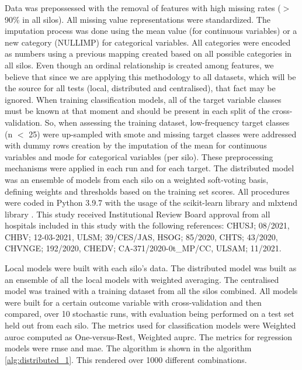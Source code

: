 Data was prepossessed with the removal of features with high missing rates ($>$ 90\% in all silos). All missing value representations were standardized. The imputation process was done using the mean value (for continuous variables) or a new category (NULLIMP) for categorical variables. All categories were encoded as numbers using a previous mapping created based on all possible categories in all silos. Even though an ordinal relationship is created among features, we believe that since we are applying this methodology to all datasets, which will be the source for all tests (local, distributed and centralised), that fact may be ignored.
When training classification models, all of the target variable classes must be known at that moment and should be present in each split of the cross-validation. So, when assessing the training dataset, low-frequency target classes (n $<$ 25) were up-sampled with \ac{smote} \cite{smote} and missing target classes were addressed with dummy rows creation by the imputation of the mean for continuous variables and mode for categorical variables (per silo). These preprocessing mechanisms were applied in each run and for each target.
The distributed model was an ensemble of models from each silo on a weighted soft-voting basis, defining weights and thresholds based on the training set scores. 
All procedures were coded in Python 3.9.7 with the usage of the scikit-learn library \cite{scikit-learn} and mlxtend library \cite{mlxtend}.
This study received Institutional Review Board approval from all hospitals included in this study with the following references: CHUSJ; 08/2021, CHBV; 12-03-2021, ULSM; 39/CES/JAS, HSOG; 85/2020, CHTS; 43/2020, CHVNGE; 192/2020,
CHEDV; CA-371/2020-0t\_MP/CC, ULSAM; 11/2021.



Local models were built with each silo's data. The distributed model was built as an ensemble of all the local models with weighted averaging. The centralised model was trained with a training dataset from all the silos combined. 
All models were built for a certain outcome variable with cross-validation and then compared, over 10 stochastic runs, with evaluation being performed on a test set held out from each silo. The metrics used for classification models were Weighted \ac{auroc} computed as One-versus-Rest, Weighted \ac{auprc}. The metrics for regression models were \ac{rmse} and \ac{mae}. The algorithm is shown in the algorithm \ref{alg:distributed_1}. This rendered over 1000 different combinations.


